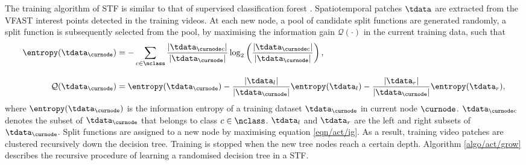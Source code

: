 The training algorithm of STF is similar to that of supervised classification forest \cite{Breiman2001}. Spatiotemporal patches $\tdata$ are extracted from the VFAST interest points detected in the training videos. 
At each new node, a pool of candidate split functions are generated randomly, a split function is subsequently selected from the pool, by maximising the information gain $\mathcal{Q}(\cdot)$ in the current training data, such that 
\begin{equation}
	\begin{aligned}
		\entropy(\tdata_{\curnode}) & = -\sum_{c \in \nclass} \frac{|\tdata_{\curnode c}|}{|\tdata_{\curnode}|}\log_{2}\left(\frac{|\tdata_{\curnode c}|}{|\tdata_{\curnode}|}\right),\\[3mm] 
		\mathcal{Q}(\tdata_{\curnode}) & = \entropy(\tdata_{\curnode}) - \frac{|\tdata_{l}|}{|\tdata_{\curnode}|}\entropy(\tdata_{l}) - \frac{|\tdata_{r}|}{|\tdata_{\curnode}|}\entropy(\tdata_{r}),
	\end{aligned}
	\label{eqn/act/ig}
\end{equation}
where $\entropy(\tdata_{\curnode})$ is the information entropy of a training dataset $\tdata_{\curnode}$ in current node $\curnode$. $\tdata_{\curnode c}$ denotes the subset of $\tdata_{\curnode}$ that belongs to class $c \in \nclass$. $\tdata_{l}$ and $\tdata_{r}$ are the left and right subsets of $\tdata_{\curnode}$.
Split functions are assigned to a new node by maximising equation \ref{eqn/act/ig}. As a result, training video patches are clustered recursively down the decision tree. Training is stopped when the new tree nodes reach a certain depth. Algorithm \ref{algo/act/grow} describes the recursive procedure of learning a randomised decision tree in a STF.

